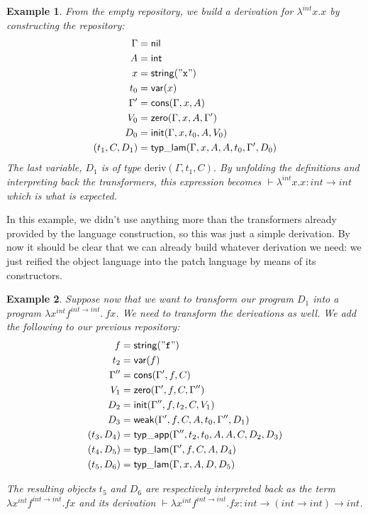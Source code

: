 \documentclass[twoside,a4paper,12pt]{article}
\newtheorem{example}{Example}
\begin{document}
\begin{example}
  From the empty repository, we build a derivation for $\lambda^{int} x. x$
  by constructing the repository:
  \begin{align}
    \Gamma &= \mathsf{nil} \\
    A &= \mathsf{int} \\
    x &= \mathsf{string}(\mathtt{"x"}) \\
    t_0 &= \mathsf{var}(x) \\
    \Gamma' &= \mathsf{cons}(\Gamma,x,A) \\
    V_0 &= \mathsf{zero}(\Gamma,x,A,\Gamma') \\
    D_0 &= \mathsf{init}(\Gamma,x,t_0,A,V_0) \\
    (t_1,C,D_1) &= \mathsf{typ\_lam}(\Gamma,x,A,A,t_0,\Gamma',D_0)
  \end{align}
  The last variable, $D_1$ is of type $\mathrm{deriv}(\Gamma,t_1,C)$.
  By unfolding the definitions and interpreting back the transformers,
  this expression becomes $\vdash\lambda^{int}x.x : int\to int$ which
  is what is expected.

\end{example}

In this example, we didn't use anything more than the transformers
already provided by the language construction, so this was just a
simple derivation. By now it should be clear that we can already build
whatever derivation we need: we just reified the object language into
the patch language by means of its constructors.

\begin{example}
  \label{ex:transf}
  Suppose now that we want to transform our program $D_1$ into a
  program $\lambda x^{int} f^{int\to int}.\ f x$. We need to transform
  the derivations as well. We add the following to our previous
  repository:
  \begin{align}
    f &= \mathsf{string}(\mathtt{"f"}) \\
    t_2 &= \mathsf{var}(f) \\
    \Gamma'' &= \mathsf{cons}(\Gamma',f,C) \\
    V_1 &= \mathsf{zero}(\Gamma',f,C,\Gamma'') \\
    D_2 &= \mathsf{init}(\Gamma'',f,t_2,C,V_1) \\
    D_3 &= \mathsf{weak}(\Gamma',f,C,A,t_0,\Gamma'',D_1) \\
    (t_3,D_4) &= \mathsf{typ\_app}(\Gamma'',t_2,t_0,A,A,C,D_2,D_3) \\
    (t_4,D_5) &= \mathsf{typ\_lam}(\Gamma',f,C,A,D_4) \\
    (t_5,D_6) &= \mathsf{typ\_lam}(\Gamma,x,A,D,D_5)
  \end{align}

  The resulting objects $t_5$ and $D_6$ are respectively interpreted
  back as the term $\lambda x^{int} f^{int\to int}.fx$ and its
  derivation $\vdash \lambda x^{int} f^{int\to int}.fx : int\to
  (int\to int)\to int$.
\end{example}
\end{document}
